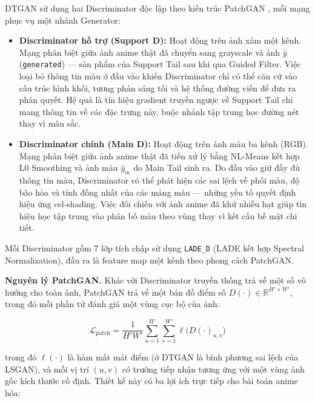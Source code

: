 DTGAN sử dụng hai Discriminator độc lập theo kiến trúc PatchGAN \cite{Isola2017}, mỗi mạng phục vụ một nhánh Generator:

\begin{itemize}
    \item \textbf{Discriminator hỗ trợ (Support D):} Hoạt động trên ảnh xám một kênh. Mạng phân biệt giữa ảnh anime thật đã chuyển sang grayscale và ảnh $\widehat{y}$ (\texttt{generated}) --- sản phẩm của Support Tail sau khi qua Guided Filter. Việc loại bỏ thông tin màu ở đầu vào khiến Discriminator chỉ có thể căn cứ vào cấu trúc hình khối, tương phản sáng tối và hệ thống đường viền để đưa ra phán quyết. Hệ quả là tín hiệu gradient truyền ngược về Support Tail chỉ mang thông tin về các đặc trưng này, buộc nhánh tập trung học đường nét thay vì màu sắc.
    \item \textbf{Discriminator chính (Main D):} Hoạt động trên ảnh màu ba kênh (RGB). Mạng phân biệt giữa ảnh anime thật đã tiền xử lý bằng NL-Means kết hợp L0 Smoothing và ảnh màu $\widehat{y}_m$ do Main Tail sinh ra. Do đầu vào giữ đầy đủ thông tin màu, Discriminator có thể phát hiện các sai lệch về phối màu, độ bão hòa và tính đồng nhất của các mảng màu --- những yếu tố quyết định hiệu ứng cel-shading. Việc đối chiếu với ảnh anime đã khử nhiễu hạt giúp tín hiệu học tập trung vào phân bố màu theo vùng thay vì kết cấu bề mặt chi tiết.
\end{itemize}

Mỗi Discriminator gồm 7 lớp tích chập sử dụng \texttt{LADE\_D} (LADE kết hợp Spectral Normalization), đầu ra là feature map một kênh theo phong cách PatchGAN.

\textbf{Nguyên lý PatchGAN.} Khác với Discriminator truyền thống trả về một số vô hướng cho toàn ảnh, PatchGAN trả về một bản đồ điểm số $D(\cdot) \in \mathbb{R}^{H' \times W'}$, trong đó mỗi phần tử đánh giá một vùng cục bộ của ảnh:

\begin{equation}
\label{eq:patchgan}
\mathcal{L}_{\text{patch}} = \frac{1}{H' W'} \sum_{u=1}^{H'} \sum_{v=1}^{W'} \ell\big(D(\cdot)_{u,v}\big)
\end{equation}

\noindent trong đó $\ell(\cdot)$ là hàm mất mát điểm (ở DTGAN là bình phương sai lệch của LSGAN), và mỗi vị trí $(u,v)$ có trường tiếp nhận tương ứng với một vùng ảnh gốc kích thước cố định. Thiết kế này có ba lợi ích trực tiếp cho bài toán anime hóa:

